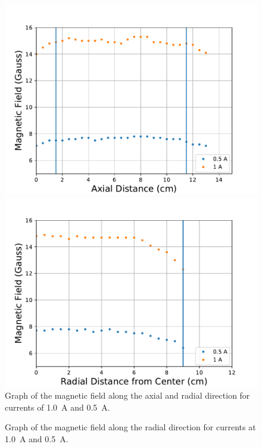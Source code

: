 \begin{figure}[h]
		\centering
		\begin{minipage}{.49\textwidth}
			\includegraphics[width = .9\textwidth]{Images/FieldAxial.pdf}
		\end{minipage}
		\begin{minipage}{.49\textwidth}
			\includegraphics[width = .9\textwidth]{Images/FieldRadial.pdf}
		\end{minipage}
		\caption{Graph of the magnetic field along the axial and radial direction for currents of \SI{1.0}{A} and \SI{0.5}{A}.}
		\label{fig:FieldAxial}
\end{figure}

\begin{figure}[h!]
		\centering
		\caption{Graph of the magnetic field along the radial direction for currents at \SI{1.0}{A} and \SI{0.5}{A}.}
		\label{fig:FieldRadial}
\end{figure}

